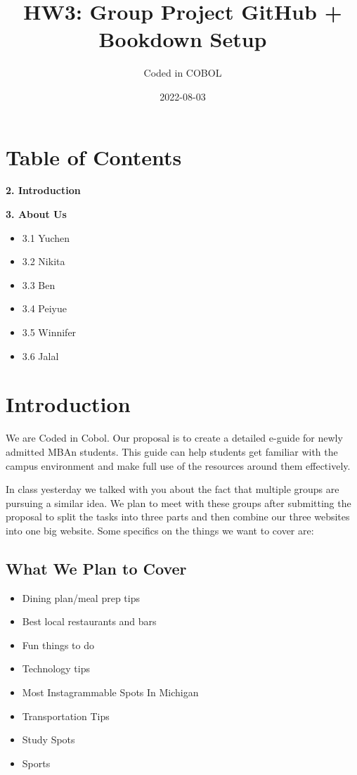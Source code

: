 \documentclass[
]{book}
\title{HW3: Group Project GitHub + Bookdown Setup}
\author{Coded in COBOL}
\date{2022-08-03}
\providecommand{\tightlist}{%
  \setlength{\itemsep}{0pt}\setlength{\parskip}{0pt}}
\begin{document}
\maketitle

{
\setcounter{tocdepth}{1}
\tableofcontents
}
\hypertarget{table-of-contents}{%
\chapter{Table of Contents}\label{table-of-contents}}

\textbf{2. Introduction}

\textbf{3. About Us}

\begin{itemize}
\tightlist
\item
  3.1 Yuchen
\item
  3.2 Nikita
\item
  3.3 Ben
\item
  3.4 Peiyue
\item
  3.5 Winnifer
\item
  3.6 Jalal
\end{itemize}

\hypertarget{introduction}{%
\chapter{Introduction}\label{introduction}}

We are Coded in Cobol. Our proposal is to create a detailed e-guide for newly admitted MBAn students. This guide can help students get familiar with the campus environment and make full use of the resources around them effectively.

In class yesterday we talked with you about the fact that multiple groups are pursuing a similar idea. We plan to meet with these groups after submitting the proposal to split the tasks into three parts and then combine our three websites into one big website. Some specifics on the things we want to cover are:

\hypertarget{what-we-plan-to-cover}{%
\section{What We Plan to Cover}\label{what-we-plan-to-cover}}

\begin{itemize}
\tightlist
\item
  Dining plan/meal prep tips
\item
  Best local restaurants and bars
\item
  Fun things to do
\item
  Technology tips
\item
  Most Instagrammable Spots In Michigan
\item
  Transportation Tips
\item
  Study Spots
\item
  Sports
\end{itemize}
\end{document}
